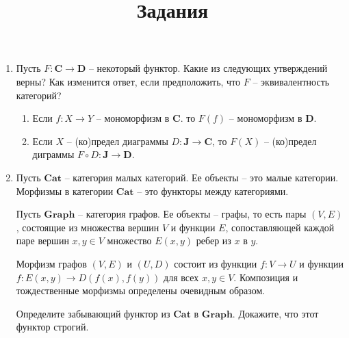 \documentclass[draft]{article}
\newcommand{\cat}[1]{\mathbf{#1}}
\renewcommand{\C}{\cat{C}}
\newcommand{\D}{\cat{D}}
\begin{document}
\title{Задания}
\maketitle

\begin{enumerate}

\item Пусть $F : \C \to \D$ -- некоторый функтор.
Какие из следующих утверждений верны?
Как изменится ответ, если предположить, что $F$ -- эквивалентность категорий?
\begin{enumerate}
\item Если $f : X \to Y$ -- мономорфизм в $\C$. то $F(f)$ -- мономорфизм в $\D$.
\item Если $X$ -- (ко)предел диаграммы $D : \cat{J} \to \C$, то $F(X)$ -- (ко)предел диграммы $F \circ D : \cat{J} \to \D$.
\end{enumerate}

\item Пусть $\cat{Cat}$ -- категория малых категорий.
Ее объекты -- это малые категории.
Морфизмы в категории $\cat{Cat}$ -- это функторы между категориями.

Пусть $\cat{Graph}$ -- категория графов.
Ее объекты -- графы, то есть пары $(V,E)$, состоящие из множества вершин $V$ и функции $E$, сопоставляющей каждой паре вершин $x,y \in V$ множество $E(x,y)$ ребер из $x$ в $y$.

Морфизм графов $(V,E)$ и $(U,D)$ состоит из функции $f : V \to U$ и функции $f : E(x,y) \to D(f(x), f(y))$ для всех $x,y \in V$.
Композиция и тождественные морфизмы определены очевидным образом.

Определите забывающий функтор из $\cat{Cat}$ в $\cat{Graph}$.
Докажите, что этот функтор строгий.

\end{enumerate}
\end{document}

